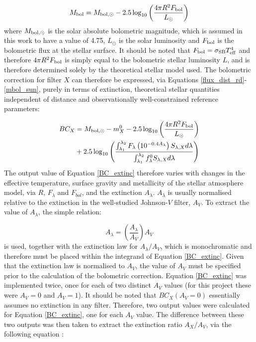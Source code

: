 \documentclass[12pt, a4paper]{report}
\begin{document}
\begin{equation}
M_{\textnormal{bol}} = M_{\textnormal{bol},\odot} - 2.5 \log_{10} \left( \frac{4\pi R^{2}F_{\textnormal{bol}}}{L_{\odot}} \right)
\label{mbol_sun}
\end{equation}
where $M_{\textnormal{bol},\odot}$ is the solar absolute bolometric magnitude, which is assumed in this work to have a value of 4.75, $L_{\odot}$ is the solar luminosity and $F_{\textnormal{bol}}$ is the bolometric flux at the stellar surface. It should be noted that $F_{\textnormal{bol}} = \sigma_{\textnormal{SB}} T_{\textnormal{eff}}^{4}$ and therefore $4\pi R^{2}F_{\textnormal{bol}}$ is simply equal to the bolometric stellar luminosity $L$, and is therefore determined solely by the theoretical stellar model used. The bolometric correction for filter $X$ can therefore be expressed, via Equations \ref{flux_dist_rd}-\ref{mbol_sun}, purely in terms of extinction, theoretical stellar quantities independent of distance and observationally well-constrained reference parameters:

\begin{align}
\begin{split}
BC_{X} &= M_{\textnormal{bol},\odot} - m_{X}^{0} - 2.5 \log_{10} \left( \frac{4\pi R^{2}F_{\textnormal{bol}}}{L_{\odot}} \right) \\
&+ 2.5 \log_{10} \left( \frac{\int_{\lambda_{1}}^{\lambda_{2}} F_{\lambda} \left( 10^{-0.4 A_{\lambda}} \right) S_{\lambda,X} d\lambda}{\int_{\lambda_{1}}^{\lambda_{2}} f_{\lambda}^{0} S_{\lambda,X} d\lambda} \right)
\label{BC_extinc}
\end{split}
\end{align}
The output value of Equation \ref{BC_extinc} therefore varies with changes in the effective temperature, surface gravity and metallicity of the stellar atmosphere model, via $R$, $F_{\lambda}$ and $F_{bol}$, and the extinction $A_{\lambda}$. $A_{\lambda}$ is usually normalised relative to the extinction in the well-studied Johnson-$V$ filter, $A_{V}$. To extract the value of $A_{\lambda}$, the simple relation:

\begin{equation}
A_{\lambda} = \left( \frac{A_{\lambda}}{A_{V}} \right) A_{V}
\label{ratio_eq}
\end{equation}
is used, together with the \cite{1989ApJ...345..245C} extinction law for $A_{\lambda}/A_{V}$, which is monochromatic and therefore must be placed within the integrand of Equation \ref{BC_extinc}. Given that the \cite{1989ApJ...345..245C} extinction law is normalised to $A_{V}$, the value of $A_{V}$ must be specified prior to the calculation of the bolometric correction. Equation \ref{BC_extinc} was implemented twice, once for each of two distinct $A_{V}$ values (for this project these were $A_{V} = 0$ and $A_{V} = 1$). It should be noted that $BC_{X}(A_{V}=0)$ essentially assumes no extinction in any filter. Therefore, two output values were calculated for Equation \ref{BC_extinc}, one for each $A_{V}$ value. The difference between these two outputs was then taken to extract the extinction ratio $A_{X}/A_{V}$, via the following equation \citep{2008PASP..120..583G}:
\end{document}
